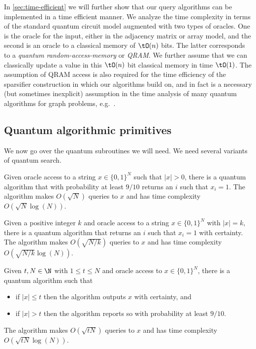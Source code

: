 In \cref{sec:time-efficient} we will further show that our query algorithms can be implemented in a time efficient manner.  We analyze the time complexity in terms of the standard quantum circuit model augmented with two types of oracles.  
One is the oracle for the input, either in the adjacency matrix or array model, and the second is an oracle to a classical memory of $\tO(n)$ bits.  The latter corresponds to a \emph{quantum random-access-memory} or \emph{QRAM}.  We further assume that 
we can classically update a value in this $\tO(n)$ bit classical memory in time $\tO(1)$.  
The assumption of QRAM access is also required for the time efficiency of the sparsifier construction in \cite{AdW19} which our algorithms build on, and in fact is a necessary (but sometimes inexplicit) assumption in the time analysis of many quantum algorithms for graph problems, e.g.~\cite{DHHM06,Amb06,B13}.

\subsection{Quantum algorithmic primitives}
We now go over the quantum subroutines we will need.  We need several variants of quantum search.
\begin{theorem}
\label{thm:grover}
Given oracle access to a string $x \in \{0,1\}^N$ such that $|x| > 0$,
there is a quantum algorithm that with probability at least $9/10$ returns an $i$ such that $x_i = 1$.
The algorithm makes $O(\sqrt{N})$ queries to $x$ and has time complexity $O(\sqrt{N} \log(N))$.
\end{theorem}

\begin{theorem}
\label{thm:qexact}
Given a positive integer $k$ and oracle access to a string $x \in \{0,1\}^N$ with $|x| = k$,
there is a quantum algorithm that returns an $i$ such that $x_i=1$ with certainty.
The algorithm makes $O(\sqrt{N/k})$ queries to $x$ and has time complexity $O(\sqrt{N/k} \log(N))$.
\end{theorem}

\begin{theorem}
\label{thm:qsearch}
Given $t,N \in \N$ with $1 \le t \le N$ and oracle access to $x \in \{0,1\}^N$,  there is a quantum algorithm such that
\begin{itemize}
  \item if $|x| \le t$ then the algorithm outputs $x$ with certainty, and
  \item if $|x| > t$ then the algorithm reports so with probability at least $9/10$.
\end{itemize}
The algorithm makes $O(\sqrt{tN})$ queries to $x$ and has time complexity $O(\sqrt{tN} \log(N))$.
\end{theorem}

